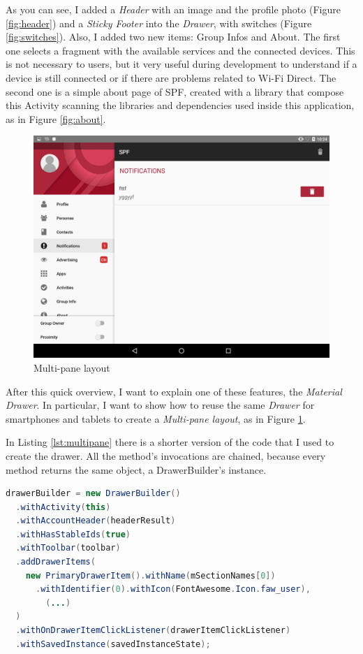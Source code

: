 As you can see, I added a \emph{Header} with an image and the profile photo (Figure \ref{fig:header}) and a \emph{Sticky Footer} into the \emph{Drawer}, with switches (Figure \ref{fig:switches}). Also, I added two new items: \textsf{Group Infos} and \textsf{About}. The first one selects a fragment with the available services and the connected devices. This is not necessary to users, but it very useful during development to understand if a device is still connected or if there are problems related to Wi-Fi Direct. The second one is a simple about page of SPF, created with a library that compose this Activity scanning the libraries and dependencies used inside this application, as in Figure \ref{fig:about}.

\begin{figure}[thpb]
	\centering
	\includegraphics[scale=0.15]{./images/chap3/tablet1.png}
	\caption{Multi-pane layout}
	\label{fig:tablet1}
\end{figure}	


After this quick overview, I want to explain one of these features, the 	\emph{Material Drawer}. In particular, I want to show how to reuse the same \emph{Drawer} for smartphones and tablets to create a \emph{Multi-pane layout}, as in Figure \ref{fig:tablet1}.

In Listing \ref{lst:multipane} there is a shorter version of the code that I used to create the drawer. All the method's invocations are chained, because every method returns the same object, a \textsf{DrawerBuilder}'s instance.


\begin{lstlisting}[caption={DrawerBuilder creations},label=lst:drawerbuilder, language=Java]
drawerBuilder = new DrawerBuilder()
  .withActivity(this)
  .withAccountHeader(headerResult)
  .withHasStableIds(true)
  .withToolbar(toolbar)
  .addDrawerItems(
    new PrimaryDrawerItem().withName(mSectionNames[0])
      .withIdentifier(0).withIcon(FontAwesome.Icon.faw_user),
    	(...)
  )
  .withOnDrawerItemClickListener(drawerItemClickListener)
  .withSavedInstance(savedInstanceState);
\end{lstlisting}


